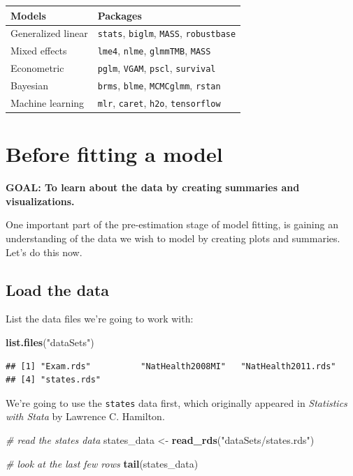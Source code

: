 \documentclass[
]{book}
\newenvironment{Shaded}{\begin{snugshade}}{\end{snugshade}}
\newcommand{\CommentTok}[1]{\textcolor[rgb]{0.56,0.35,0.01}{\textit{#1}}}
\newcommand{\KeywordTok}[1]{\textcolor[rgb]{0.13,0.29,0.53}{\textbf{#1}}}
\newcommand{\NormalTok}[1]{#1}
\newcommand{\StringTok}[1]{\textcolor[rgb]{0.31,0.60,0.02}{#1}}
\begin{document}
\begin{longtable}[]{@{}ll@{}}
\toprule
Models & Packages\tabularnewline
\midrule
\endhead
Generalized linear & \texttt{stats}, \texttt{biglm}, \texttt{MASS}, \texttt{robustbase}\tabularnewline
Mixed effects & \texttt{lme4}, \texttt{nlme}, \texttt{glmmTMB}, \texttt{MASS}\tabularnewline
Econometric & \texttt{pglm}, \texttt{VGAM}, \texttt{pscl}, \texttt{survival}\tabularnewline
Bayesian & \texttt{brms}, \texttt{blme}, \texttt{MCMCglmm}, \texttt{rstan}\tabularnewline
Machine learning & \texttt{mlr}, \texttt{caret}, \texttt{h2o}, \texttt{tensorflow}\tabularnewline
\bottomrule
\end{longtable}

\hypertarget{before-fitting-a-model}{%
\section{Before fitting a model}\label{before-fitting-a-model}}

\textbf{GOAL: To learn about the data by creating summaries and visualizations.}

One important part of the pre-estimation stage of model fitting, is gaining an understanding of the data we wish to model by creating plots and summaries. Let's do this now.

\hypertarget{load-the-data}{%
\subsection{Load the data}\label{load-the-data}}

List the data files we're going to work with:

\begin{Shaded}
\begin{Highlighting}[]
\KeywordTok{list.files}\NormalTok{(}\StringTok{"dataSets"}\NormalTok{)}
\end{Highlighting}
\end{Shaded}

\begin{verbatim}
## [1] "Exam.rds"          "NatHealth2008MI"   "NatHealth2011.rds"
## [4] "states.rds"
\end{verbatim}

We're going to use the \texttt{states} data first, which originally appeared in \emph{Statistics with Stata} by Lawrence C. Hamilton.

\begin{Shaded}
\begin{Highlighting}[]
  \CommentTok{\# read the states data}
\NormalTok{  states\_data \textless{}{-}}\StringTok{ }\KeywordTok{read\_rds}\NormalTok{(}\StringTok{"dataSets/states.rds"}\NormalTok{)}

  \CommentTok{\# look at the last few rows}
  \KeywordTok{tail}\NormalTok{(states\_data)}
\end{Highlighting}
\end{Shaded}
\end{document}
